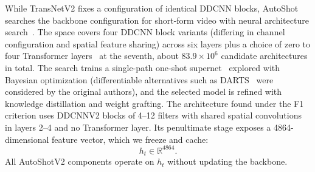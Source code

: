 While TransNetV2 fixes a configuration of identical DDCNN blocks, AutoShot
searches the backbone configuration for short-form video with neural
architecture search~\cite{zhu2023autoshot,elsken2019nas,white2023_nas1000,ren2020_nas_survey}.
The space covers four DDCNN block variants (differing in channel
configuration and spatial feature sharing) across six layers plus a choice
of zero to four Transformer layers~\cite{vaswani2017attention} at the
seventh, about $83.9\times10^6$ candidate architectures in total. The search
trains a single-path one-shot supernet~\cite{guo2020spos} explored with
Bayesian optimization (differentiable alternatives such as
DARTS~\cite{liu2019darts} were considered by the original authors), and the
selected model is refined with knowledge distillation and weight grafting.
The architecture found under the F1 criterion uses DDCNNV2 blocks of 4--12
filters with shared spatial convolutions in layers 2--4 and no Transformer
layer. Its penultimate stage exposes a 4864-dimensional feature vector,
which we freeze and cache:
\begin{equation}
    h_t \in \mathbb{R}^{4864}.
    \label{eq:features}
\end{equation}
All AutoShotV2 components operate on $h_t$ without updating the backbone.

